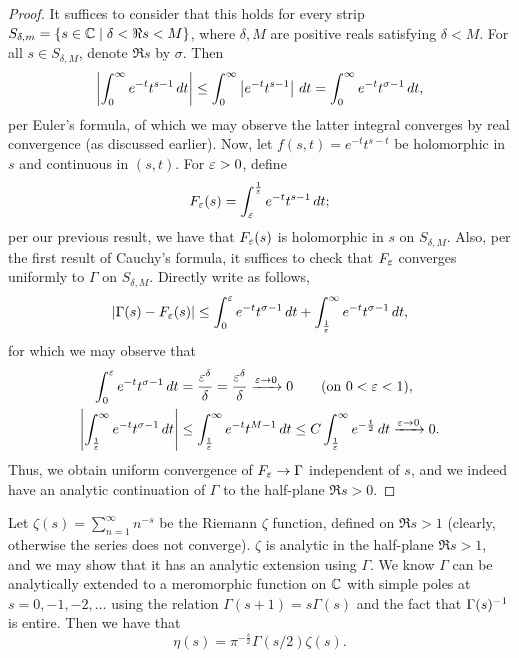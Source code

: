\begin{proof}
    It suffices to consider that this holds for every strip $S_{\delta, m} = \{s \in \mathbb C \mid \delta < \Re s < M\}$, where $\delta, M$ are positive reals satisfying $\delta < M$. For all $s \in S_{\delta, M}$, denote $\Re s$ by $\sigma$. Then
    \[ \left\lvert \int_0^\infty e^{-t} t^{s-1} \, dt \right\rvert \leq \int_0^\infty \left\lvert e^{-t} t^{s-1} \right\rvert \, dt = \int_0^\infty e^{-t} t^{\sigma - 1} \, dt, \]
    per Euler's formula, of which we may observe the latter integral converges by real convergence (as discussed earlier). Now, let $f(s, t) = e^{-t} t^{s-t}$ be holomorphic in $s$ and continuous in $(s, t)$. For $\varepsilon > 0$, define
    \[ F_\varepsilon(s) = \int_\varepsilon^{\frac{1}{\varepsilon}} e^{-t} t^{s-1} \, dt; \]
    per our previous result, we have that $F_\varepsilon(s)$ is holomorphic in $s$ on $S_{\delta, M}$. Also, per the first result of Cauchy's formula, it suffices to check that $F_\varepsilon$ converges uniformly to $\Gamma$ on $S_{\delta, M}$. Directly write as follows,
    \[ \left\lvert \Gamma(s) - F_\varepsilon(s) \right\rvert \leq \int_0^\varepsilon e^{-t} t^{\sigma - 1} \, dt + \int_{\frac{1}{\varepsilon}}^\infty e^{-t} t^{\sigma - 1} \, dt, \]
    for which we may observe that
    \begin{align*}
        \int_0^\eps e^{-t} t^{\sigma - 1} \, dt &= \frac{\eps^\delta}{\delta} = \frac{\eps^\delta}{\delta} \taking{\eps \to 0} 0 \tag{on $0 < \eps < 1$}, \\
        \abs{\int_{\frac{1}{\eps}}^\infty e^{-t} t^{\sigma - 1} \, dt} &\leq \int_{\frac{1}{\eps}}^\infty e^{-t} t^{M-1} \, dt \leq C \int_{\frac{1}{\eps}}^\infty e^{-\frac{t}{2}} \, dt \taking{\eps \to 0} 0.
    \end{align*}
    Thus, we obtain uniform convergence of $F_\varepsilon \to \Gamma$ independent of $s$, and we indeed have an analytic continuation of $\Gamma$ to the half-plane $\Re s > 0$.
\end{proof}
\noindent Let $\zeta(s) = \sum_{n=1}^\infty n^{-s}$ be the Riemann $\zeta$ function, defined on $\Re s > 1$ (clearly, otherwise the series does not converge). $\zeta$ is analytic in the half-plane $\Re s > 1$, and we may show that it has an analytic extension using $\Gamma$. We know $\Gamma$ can be analytically extended to a meromorphic function on $\mathbb C$ with simple poles at $s = 0, -1, -2, \dots$ using the relation $\Gamma(s + 1) = s \Gamma(s)$ and the fact that $\Gamma(s)^{-1}$ is entire. Then we have that
\[ \eta(s) = \pi^{-\frac{s}{2}} \Gamma(s/2) \zeta(s). \]